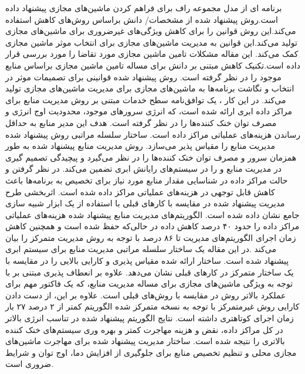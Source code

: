 \cite{num10}
     برنامه ای از مدل مجموعه راف برای فراهم کردن ماشین‌های مجازی پیشنهاد داده است.روش پیشنهاد شده از مشخصات/ دانش براساس روش‌های کاهش استفاده می‌کند.این روش قوانین را برای کاهش ویژگی‌های غیرضروری برای ماشین‌های مجازی تولید می‌کند.این قوانین به مدیریت ماشین‌های مجازی برای انتخاب موثر ماشین مجازی کمک می‌کند. این مقاله مشکلات تامین ماشین مجازی مورد تقاضا را مورد بررسی قرار داده است.تکنیک کاهش مبتنی بر دانش برای مساله تامین ماشین مجازی براساس منابع موجود را در نظر گرفته است. روش پیشنهاد شده قوانینی برای تصمیمات موثر در انتخاب و نگاشت برنامه‌ها به ماشین‌های مجازی برای مدیریت ماشین‌های مجازی تولید می‌کند.
در این کار 
\cite{num11}
، 
یک توافق‌نامه سطح خدمات 
 مبتنی بر روش مدیریت منابع برای مراکز داده ابری ارائه شده است، که انرژی سرورهای موجود، محدودیت اوج انرژی و مصرف توان خنک کننده‌ها را در نظر گرفته است. هدف این مدیر منابع به حداقل رساندن هزینه‌های عملیاتی مراکز داده است. ساختار سلسله مراتبی روش پیشنهاد شده مدیریت منابع را مقیاس پذیر می‌سازد. روش مدیریت منابع پیشنهاد شده به طور همزمان سرور و مصرف توان خنک کننده‌ها را در نظر می‌گیرد و پیچیدگی تصمیم گیری در مدیریت منابع و
   را در سیستم‌های رایانش ابری تضمین می‌کند. در نظر گرفتن
    و حالت مراکز داده در شناسایی مقدار منابع مورد نیاز برای تخصیص به برنامه‌ها باعث کاهش قابل توجهی در هزینه‌های عملیاتی مراکز داده شده است. اثربخشی طرح مدیریت پیشنهاد شده در مقایسه با کارهای قبلی با استفاده از یک ابزار شبیه سازی جامع نشان داده شده است. الگوریتم‌های مدیریت منابع پیشنهاد شده هزینه‌های عملیاتی مراکز داده را حدود ۴۰ درصد کاهش داده در حالی‌که
     حفظ شده است و همچنین کاهش زمان اجرای الگوریتم‌های مدیریت تا  ۸۶ درصد با توجه به روش مدیریت متمرکز را بیان می‌کند .در این مقاله یک ساختار سلسله مراتبی مدیریت منابع برای سیستم ابری پیشنهاد شده است. ساختار ارائه شده مقیاس پذیری و کارایی بالایی را در مقایسه با یک ساختار متمرکز در کارهای قبلی نشان می‌دهد. علاوه بر انعطاف پذیری مبتنی بر
      با توجه به ویژگی ماشین‌های مجازی برای مساله مدیریت منابع، که  یک فاکتور مهم برای عملکرد بالاتر روش در مقایسه با روش‌های قبلی است. علاوه بر این، از دست دادن کارایی روش غیرمتمرکز با توجه به نسخه متمرکز شده الگوریتم کمتر از ۲ درصد ۲۷ بار زمان اجرای کوتاهتری داشته است. نتایج الگوریتم پیشنهاد شده در تناسب انرژی بالاتر در کل مراکز داده، نقض
      و هزینه مهاجرت کمتر و بهره وری سیستم‌های خنک کننده بالاتری را نتیجه شده است. ساختار مدیریت پیشنهاد شده برای مهاجرت ماشین‌های مجازی محلی و تنظیم تخصیص منابع برای جلوگیری از افزایش دما، اوج توان و شرایط
      ضروری است.

